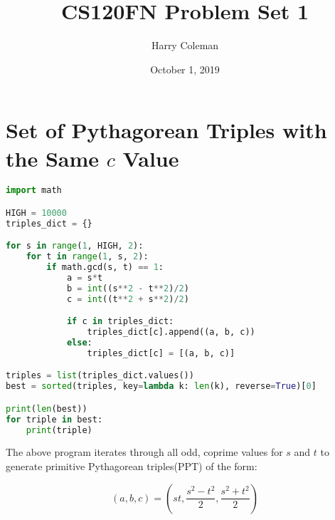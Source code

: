 \documentclass[12pt]{article}
\begin{document}
 
 
\title{CS120FN Problem Set 1}
\author{Harry Coleman}
\date{October 1, 2019}

\maketitle

\section{Set of Pythagorean Triples with the Same $c$ Value}

\begin{lstlisting}[language=Python, frame=single, basicstyle=\footnotesize]
import math

HIGH = 10000
triples_dict = {}

for s in range(1, HIGH, 2):
	for t in range(1, s, 2):
		if math.gcd(s, t) == 1:
			a = s*t
			b = int((s**2 - t**2)/2)
			c = int((t**2 + s**2)/2)

			if c in triples_dict:
				triples_dict[c].append((a, b, c))
			else:
				triples_dict[c] = [(a, b, c)]

triples = list(triples_dict.values())
best = sorted(triples, key=lambda k: len(k), reverse=True)[0]

print(len(best))
for triple in best:
	print(triple)
\end{lstlisting}

The above program iterates through all odd, coprime values for $s$ and $t$ to generate primitive Pythagorean triples(PPT) of the form:

\begin{equation}
    (a, b, c) = \left(st, \frac{s^2 - t^2}{2}, \frac{s^2 + t^2}{2}\right)
\end{equation}
\end{document}

